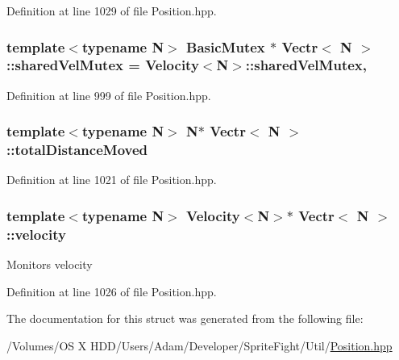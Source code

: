 Definition at line 1029 of file Position.\-hpp.

\hypertarget{struct_vectr_a1cc9dc723075fb24116b6a78ac73e786}{
\subsubsection[{shared\-Vel\-Mutex}]{\setlength{\rightskip}{0pt plus 5cm}template$<$typename N$>$ {\bf Basic\-Mutex} $\ast$ {\bf Vectr}$<$ N $>$\-::shared\-Vel\-Mutex = {\bf Velocity}$<$N$>$\-::shared\-Vel\-Mutex\hspace{0.3cm}{\ttfamily [static]}, {\ttfamily [protected]}}}\label{struct_vectr_a1cc9dc723075fb24116b6a78ac73e786}


Definition at line 999 of file Position.\-hpp.

\hypertarget{struct_vectr_a577bdf47f67b34585ee08696679b2232}{
\subsubsection[{total\-Distance\-Moved}]{\setlength{\rightskip}{0pt plus 5cm}template$<$typename N$>$ N$\ast$ {\bf Vectr}$<$ N $>$\-::total\-Distance\-Moved\hspace{0.3cm}{\ttfamily [protected]}}}\label{struct_vectr_a577bdf47f67b34585ee08696679b2232}


Definition at line 1021 of file Position.\-hpp.

\hypertarget{struct_vectr_aef611170eac7b1341ff345b9bb108eb7}{
\subsubsection[{velocity}]{\setlength{\rightskip}{0pt plus 5cm}template$<$typename N$>$ {\bf Velocity}$<$N$>$$\ast$ {\bf Vectr}$<$ N $>$\-::velocity\hspace{0.3cm}{\ttfamily [protected]}}}\label{struct_vectr_aef611170eac7b1341ff345b9bb108eb7}
Monitors velocity 

Definition at line 1026 of file Position.\-hpp.



The documentation for this struct was generated from the following file\-:\begin{DoxyCompactItemize}
\item 
/\-Volumes/\-O\-S X H\-D\-D/\-Users/\-Adam/\-Developer/\-Sprite\-Fight/\-Util/\hyperlink{_position_8hpp}{Position.\-hpp}\end{DoxyCompactItemize}
